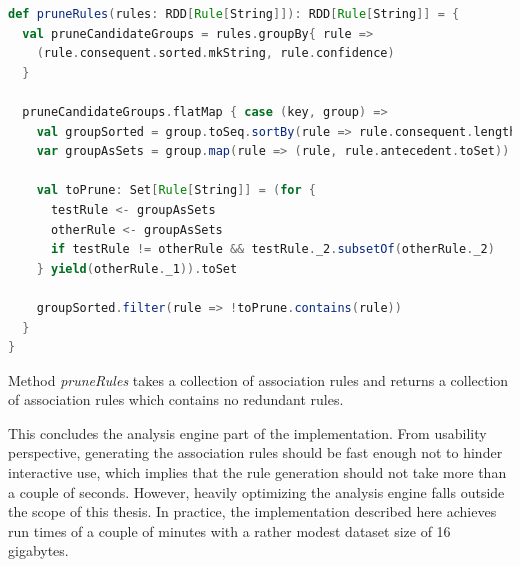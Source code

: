 \begin{minipage}{0.95\linewidth}
\begin{lstlisting}[language=scala] 
def pruneRules(rules: RDD[Rule[String]]): RDD[Rule[String]] = {
  val pruneCandidateGroups = rules.groupBy{ rule => 
    (rule.consequent.sorted.mkString, rule.confidence) 
  }

  pruneCandidateGroups.flatMap { case (key, group) =>
    val groupSorted = group.toSeq.sortBy(rule => rule.consequent.length)
    var groupAsSets = group.map(rule => (rule, rule.antecedent.toSet))

    val toPrune: Set[Rule[String]] = (for {
      testRule <- groupAsSets
      otherRule <- groupAsSets
      if testRule != otherRule && testRule._2.subsetOf(otherRule._2)
    } yield(otherRule._1)).toSet
    
    groupSorted.filter(rule => !toPrune.contains(rule))
  }
}
\end{lstlisting}
\end{minipage}       

Method \textit{pruneRules} takes a collection of association rules and returns a collection of association rules which contains no redundant rules.

This concludes the analysis engine part of the implementation. From usability perspective, generating the association rules should be fast enough not to hinder interactive use, which implies that the rule generation should not take more than a couple of seconds. However, heavily optimizing the analysis engine falls outside the scope of this thesis. In practice, the implementation described here achieves run times of a couple of minutes with a rather modest dataset size of 16 gigabytes.


   